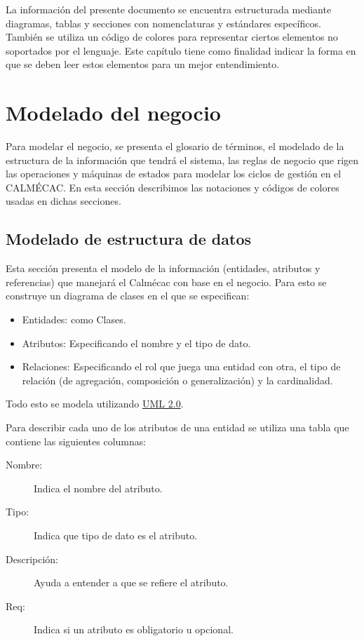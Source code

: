 
La información del presente documento se encuentra estructurada mediante diagramas, tablas y secciones con nomenclaturas y estándares específicos. También se utiliza un código de colores para representar ciertos elementos no soportados por el lenguaje. Este capítulo tiene como finalidad indicar la forma en que se deben leer estos elementos para un mejor entendimiento.
\section{Modelado del negocio}


Para modelar el negocio, se presenta el glosario de términos, el modelado de la estructura de la información que tendrá el sistema, las reglas de negocio que rigen las operaciones y máquinas de estados para modelar los ciclos de gestión en el CALMÉCAC.  En esta sección describimos las notaciones y códigos de colores usadas en dichas secciones.

\subsection{Modelado de estructura de datos}
\label{sec:ModeladoDatos}


Esta sección presenta el modelo de la información (entidades, atributos y referencias) que manejará el Calmécac con base en el negocio. Para esto se construye un diagrama de clases en el que se especifican:

\begin{itemize}
	\item Entidades: como Clases.
	\item Atributos: Especificando el nombre y el tipo de dato.
	\item Relaciones: Especificando el rol que juega una entidad con otra, el tipo de relación (de agregación, composición o generalización) y la cardinalidad.
\end{itemize}

Todo esto se modela utilizando \href{http://www.omg.org/spec/UML/2.0/}{UML 2.0}.


Para describir  cada uno de los atributos de una entidad se utiliza una tabla que contiene las siguientes columnas:

\begin{description}
	\item[Nombre:] Indica el nombre del atributo.
	\item[Tipo:] Indica que tipo de dato es el atributo.
	\item[Descripción:] Ayuda a entender a que se refiere el atributo.
	\item[Req:]  Indica si un atributo es obligatorio u opcional.
\end{description}

